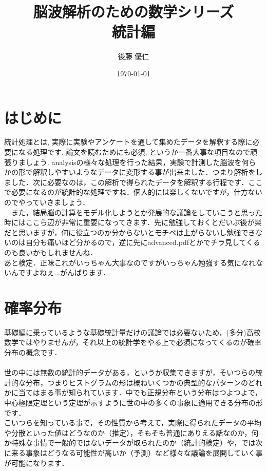 \documentclass[11pt,a4paper,uplatex]{ujreport} 	%
\title{脳波解析のための数学シリーズ\\
統計編}
\author{後藤 優仁}
\date{\today}
\begin{document}
\maketitle

\newpage
%
%
\tableofcontents
\newpage
\chapter{はじめに}
 統計処理とは, 実際に実験やアンケートを通して集めたデータを解釈する際に必要になる処理です. 論文を読むためにも必須, というか一番大事な項目なので頑張りましょう. analysisの様々な処理を行った結果，実験で計測した脳波を何らかの形で解釈しやすいようなデータに変形する事が出来ました．つまり解析をしました．次に必要なのは，この解析で得られたデータを解釈する行程です．ここで必要になるのが統計的な処理ですね．個人的には楽しくないですが，仕方ないのでやっていきましょう．\\
 　また，結局脳の計算をモデル化しようとか発展的な議論をしていこうと思った時にはここら辺が非常に重要になってきます．先に勉強しておくとだいぶ後が楽だと思いますが，何に役立つのか分からないとモチベは上がらないし勉強できないのは自分も痛いほど分かるので，逆に先にadvanced.pdfとかでチラ見してくるのも良いかもしれませんね．\\

あと検定．正味これがいっちゃん大事なのですがいっちゃん勉強する気になれないんですよねぇ...がんばります．
 
 \newpage
 
 
\chapter{確率分布}
基礎編に乗っているような基礎統計量だけの議論では必要ないため，(多分)高校数学ではやりませんが，それ以上の統計学をやる上で必須になってくるのが確率分布の概念です．\\
\\

世の中には無数の統計的データがある，というか収集できますが，そいつらの統計的な分布，つまりヒストグラムの形は概ねいくつかの典型的なパターンのどれかに当てはまる事が知られています．中でも正規分布という分布はつよつよで，中心極限定理という定理が示すように世の中の多くの事象に適用できる分布の形です．\\

こいつらを知っている事で，その性質から考えて，実際に得られたデータの平均や分散といった値はどうなのか（推定），そもそも普通にありえる話なのか，何か特殊な事情で一般的ではないデータが取られたのか（統計的検定）や，では次に来る事象はどうなる可能性が高いか（予測）など様々な議論を展開していく事が可能になります．\\
\end{document}

